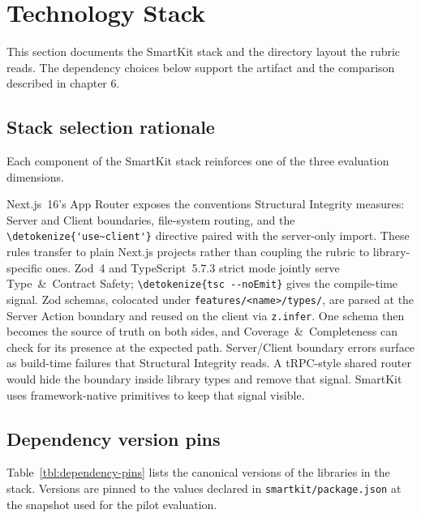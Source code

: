 \documentclass[12pt,a4paper]{report}
\newcommand{\code}[1]{\texttt{\nolinkurl{\detokenize{#1}}}}
\newcommand{\pkg}[1]{\texttt{\nolinkurl{#1}}}
\DeclareRobustCommand{\filename}[1]{\bgroup\urlstyle{tt}\nolinkurl{#1}\egroup}
\newcommand{\usec}{\code{'use~client'}}
\begin{document}
\section{Technology Stack}
\label{sec:technology-stack}

This section documents the SmartKit stack and the directory layout the rubric reads. The dependency choices below support the artifact and the comparison described in chapter 6.

\subsection{Stack selection rationale}
\label{sec:stack-rationale}

Each component of the SmartKit stack reinforces one of the three evaluation dimensions.

Next.js~16's App Router exposes the conventions Structural Integrity measures: Server and Client boundaries, file-system routing, and the \usec{} directive paired with the server-only import. These rules transfer to plain Next.js projects rather than coupling the rubric to library-specific ones. Zod~4 and TypeScript~5.7.3 strict mode jointly serve Type~\&~Contract Safety; \code{tsc --noEmit} gives the compile-time signal. Zod schemas, colocated under \filename{features/<name>/types/}, are parsed at the Server Action boundary and reused on the client via \pkg{z.infer}. One schema then becomes the source of truth on both sides, and Coverage~\&~Completeness can check for its presence at the expected path. Server/Client boundary errors surface as build-time failures that Structural Integrity reads. A tRPC-style shared router would hide the boundary inside library types and remove that signal. SmartKit uses framework-native primitives to keep that signal visible.

\subsection{Dependency version pins}
\label{sec:dependency-pins}

Table~\ref{tbl:dependency-pins} lists the canonical versions of the libraries in the stack. Versions are pinned to the values declared in \filename{smartkit/package.json} at the snapshot used for the pilot evaluation.
\end{document}
